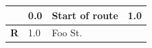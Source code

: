 \documentclass[11pt]{article}
\begin{document}
\renewcommand{\arraystretch}{1.15}
\twocolumn
{}
\tabletail{\hline}
\tablelasttail{\hline}
\begin{center}
  \begin{supertabular}{|c|p{0.30in}|p{2.25in}|l|}
  \hline
{} \textbf{} &   0.0 & Start of route &   1.0 \\ \hline
{} \textbf{R} &   1.0 & Foo St. &  \\ \hline

\end{supertabular}
\end{center}
\end{document}
